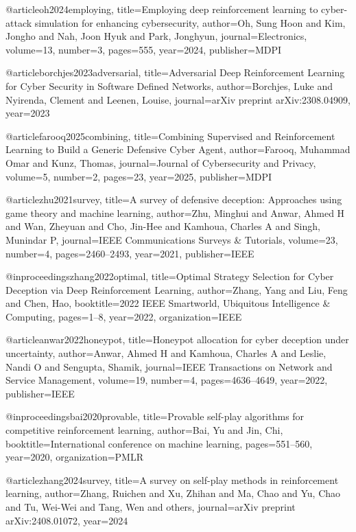 @article{oh2024employing,
  title={Employing deep reinforcement learning to cyber-attack simulation for enhancing cybersecurity},
  author={Oh, Sung Hoon and Kim, Jongho and Nah, Joon Hyuk and Park, Jonghyun},
  journal={Electronics},
  volume={13},
  number={3},
  pages={555},
  year={2024},
  publisher={MDPI}
}

@article{borchjes2023adversarial,
  title={Adversarial Deep Reinforcement Learning for Cyber Security in Software Defined Networks},
  author={Borchjes, Luke and Nyirenda, Clement and Leenen, Louise},
  journal={arXiv preprint arXiv:2308.04909},
  year={2023}
}

@article{farooq2025combining,
  title={Combining Supervised and Reinforcement Learning to Build a Generic Defensive Cyber Agent},
  author={Farooq, Muhammad Omar and Kunz, Thomas},
  journal={Journal of Cybersecurity and Privacy},
  volume={5},
  number={2},
  pages={23},
  year={2025},
  publisher={MDPI}
}

@article{zhu2021survey,
  title={A survey of defensive deception: Approaches using game theory and machine learning},
  author={Zhu, Minghui and Anwar, Ahmed H and Wan, Zheyuan and Cho, Jin-Hee and Kamhoua, Charles A and Singh, Munindar P},
  journal={IEEE Communications Surveys \& Tutorials},
  volume={23},
  number={4},
  pages={2460--2493},
  year={2021},
  publisher={IEEE}
}

@inproceedings{zhang2022optimal,
  title={Optimal Strategy Selection for Cyber Deception via Deep Reinforcement Learning},
  author={Zhang, Yang and Liu, Feng and Chen, Hao},
  booktitle={2022 IEEE Smartworld, Ubiquitous Intelligence \& Computing},
  pages={1--8},
  year={2022},
  organization={IEEE}
}

@article{anwar2022honeypot,
  title={Honeypot allocation for cyber deception under uncertainty},
  author={Anwar, Ahmed H and Kamhoua, Charles A and Leslie, Nandi O and Sengupta, Shamik},
  journal={IEEE Transactions on Network and Service Management},
  volume={19},
  number={4},
  pages={4636--4649},
  year={2022},
  publisher={IEEE}
}

@inproceedings{bai2020provable,
  title={Provable self-play algorithms for competitive reinforcement learning},
  author={Bai, Yu and Jin, Chi},
  booktitle={International conference on machine learning},
  pages={551--560},
  year={2020},
  organization={PMLR}
}

@article{zhang2024survey,
  title={A survey on self-play methods in reinforcement learning},
  author={Zhang, Ruichen and Xu, Zhihan and Ma, Chao and Yu, Chao and Tu, Wei-Wei and Tang, Wen and others},
  journal={arXiv preprint arXiv:2408.01072},
  year={2024}
}

